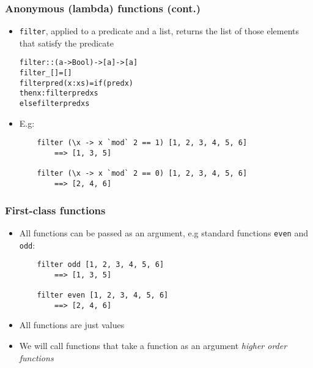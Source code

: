 \documentclass[final,handout]{beamer}
\begin{document}
\begin{frame}[fragile]
    \frametitle{Anonymous (lambda) functions (cont.)}

    \begin{itemize}
        \item \texttt{filter}, applied to a predicate and a list, returns the list of
            those elements that satisfy the predicate
    \pause
        \begin{alltt}
    filter :: (a -> Bool) -> [a] -> [a]
    filter _    []     = []
    filter pred (x:xs) = if (pred x)
        then x : filter pred xs
        else filter pred xs
        \end{alltt}

        \item<3-> E.g:
        \begin{verbatim}
    filter (\x -> x `mod` 2 == 1) [1, 2, 3, 4, 5, 6]
        ==> [1, 3, 5]

    filter (\x -> x `mod` 2 == 0) [1, 2, 3, 4, 5, 6]
        ==> [2, 4, 6]
        \end{verbatim}
    \end{itemize}

\end{frame}

\begin{frame}[fragile]
    \frametitle{First-class functions}

    \begin{itemize}
        \item All functions can be passed as an argument, 
            e.g standard functions \texttt{even} and \texttt{odd}:
        \begin{verbatim}
    filter odd [1, 2, 3, 4, 5, 6]
        ==> [1, 3, 5]

    filter even [1, 2, 3, 4, 5, 6]
        ==> [2, 4, 6]
        \end{verbatim}
        \item<2-> All functions are just values
        \item<3-> We will call functions that take a function as an argument
            \emph{higher order functions}



    \end{itemize}

\end{frame}
\end{document}
